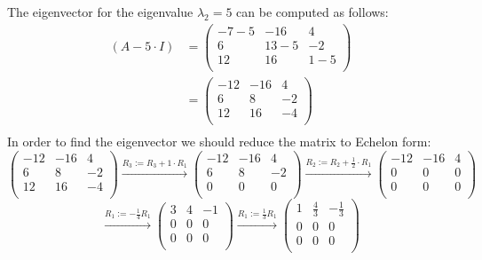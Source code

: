 \documentclass[a4paper]{article}
\begin{document}


The eigenvector for the eigenvalue $\lambda_2 = 5$ can be computed as follows:
\begin{align*}
  (A - 5 \cdot I) &= \left(
  \begin{array}{rrr}
  -7 - 5 & -16 & 4 \\
  6 & 13 - 5 & -2 \\
  12 & 16 & 1 - 5 \\
  \end{array}
  \right) \\
  &= \left(
  \begin{array}{rrr}
  -12 & -16 & 4 \\
  6 & 8 & -2 \\
  12 & 16 & -4 \\
  \end{array}
  \right) \\
\end{align*}
In order to find the eigenvector we should reduce the matrix to Echelon form:
\[
\left(
\begin{array}{rrr}
-12 & -16 & 4 \\
6 & 8 & -2 \\
12 & 16 & -4 \\
\end{array}
\right)
\xrightarrow{R_3 := R_3 + 1 \cdot R_1}
\left(
\begin{array}{rrr}
-12 & -16 & 4 \\
6 & 8 & -2 \\
0 & 0 & 0 \\
\end{array}
\right)
\xrightarrow{R_2 := R_2 + \frac{1}{2} \cdot R_1}
\left(
\begin{array}{rrr}
-12 & -16 & 4 \\
0 & 0 & 0 \\
0 & 0 & 0 \\
\end{array}
\right)
\]
\[
\xrightarrow{R_1 := - \frac{1}{4} R_1}
\left(
\begin{array}{rrr}
3 & 4 & -1 \\
0 & 0 & 0 \\
0 & 0 & 0 \\
\end{array}
\right)
\xrightarrow{R_1 := \frac{1}{3} R_1}
\left(
\begin{array}{rrr}
1 & \frac{4}{3} & - \frac{1}{3} \\
0 & 0 & 0 \\
0 & 0 & 0 \\
\end{array}
\right)
\]
\end{document}
